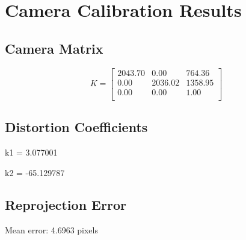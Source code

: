 \documentclass[conference]{IEEEtran}
\begin{document}
\section{Camera Calibration Results}
\subsection{Camera Matrix}
\[ K = \begin{bmatrix}
2043.70 & 0.00 & 764.36 \\
0.00 & 2036.02 & 1358.95 \\
0.00 & 0.00 & 1.00 \\
\end{bmatrix} \]

\subsection{Distortion Coefficients}
k1 = 3.077001

k2 = -65.129787

\subsection{Reprojection Error}
Mean error: 4.6963 pixels
\end{document}
